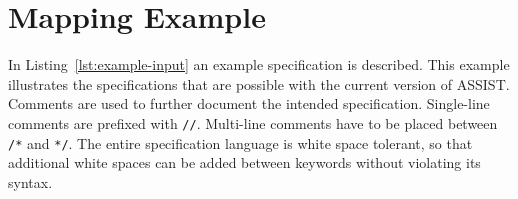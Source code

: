 
\chapter{Mapping Example }
\label{cha:example-input}

In Listing~\ref{lst:example-input} an example specification is described. 
This example illustrates the specifications that are possible with the current version of ASSIST.
Comments are used to further document the intended specification. 
Single-line comments are prefixed with \verb|//|.
Multi-line comments have to be placed between \verb|/*| and \verb|*/|.
The entire specification language is white space tolerant, so that additional white spaces can be added between keywords without violating its syntax.

  


